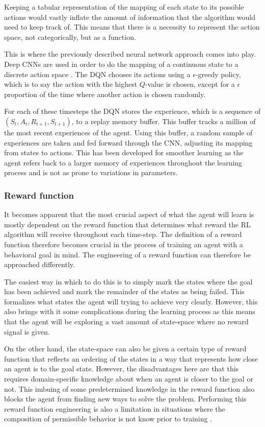 Keeping a tabular representation of the mapping of 
each state to its possible actions would vastly inflate the amount of information 
that the algorithm would need to keep track of. This means that there is a necessity 
to represent the action space, not categorically, but as a function. 

This is where 
the previously described neural network approach comes into play. Deep CNNs are 
used in order to do the mapping of a continuous state to a discrete action space \cite{DQNDeepmind}. 
The DQN chooses its actions using a $\epsilon$-greedy policy, which is to say the 
action with the highest $Q$-value is chosen, except for a $\epsilon$ proportion 
of the time where another action is chosen randomly. 

For each of these timesteps 
the DQN stores the experience, which is a sequence of $(S_t, A_t, R_{t+1}, S_{t+1})$, 
to a replay memory buffer. This buffer tracks a million of the most recent experiences 
of the agent. Using this buffer, a random sample of experiences are taken and 
fed forward through the CNN, adjusting its mapping from states to actions. This 
has been developed for smoother learning as the agent refers back to a larger memory of 
experiences throughout the learning process and is not as prone to variations 
in parameters. 

\subsubsection{Reward function}
It becomes apparent that the most crucial aspect of what the agent will learn 
is mostly dependent on the reward function that determines what reward the 
RL algorithm will receive throughout each time-step. The definition of a reward 
function therefore becomes crucial in the process of training an agent with a 
behavioral goal in mind. The engineering of a reward function can therefore be 
approached differently. 

The easiest way in which to do this is to simply mark 
the states where the goal has been achieved and mark the remainder of the states 
as being failed. This formalizes what states the agent will trying to achieve 
very clearly. However, this also brings with it some complications during the 
learning process as this means that the agent will be exploring a vast amount 
of state-space where no reward signal is given. 

On the other hand, the state-space can also be given a certain type of reward 
function that reflects an ordering of the states in a way that represents how close 
an agent is to the goal state. However, the disadvantages here are that this 
requires domain-specific knowledge about when an agent is closer to the goal or not. 
This imbuing of some predetermined knowledge in the reward function also blocks 
the agent from finding new ways to solve the problem. Performing 
this reward function engineering is also a limitation in situations where the 
composition of permissible behavior is not know prior to training \cite{rewardshaping}. 

